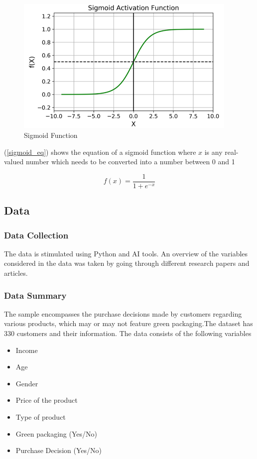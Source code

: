 \documentclass[a4paper,10pt]{article}
\begin{document}
\begin{figure}[ht]
\centering
\includegraphics[height=6.6cm]{figures/sigmoid.png}
\caption{Sigmoid Function}
\label{sigmoid}
\end{figure}

(\ref{sigmoid_eq}) shows the equation of a sigmoid function where $x$ is any real-valued number which needs to be converted into a number between 0 and 1

\begin{equation}
f(x) = \frac{1}{1 + e^{-x}}
\label{sigmoid_eq}
\end{equation}

\subsection{Data}
\subsubsection{Data Collection}

The data is stimulated using Python and AI tools. An overview of the variables considered in the data was taken by going through different research papers and articles. 

\subsubsection{Data Summary}
The sample encompasses the purchase decisions made by customers regarding various products, which may or may not feature green packaging.The dataset has 330 customers and their information. 
The data consists of the following variables
\begin{itemize}

    \item Income 
    \item Age 
    \item Gender 
    \item Price of the product
    \item Type of product
    \item Green packaging (Yes/No)
    \item Purchase Decision (Yes/No)
\end{itemize}
\end{document}
